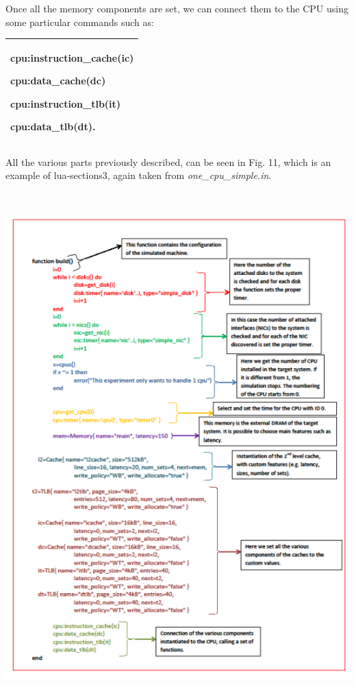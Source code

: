 \documentclass[a4paper]{article}
\begin{document}
\bigskip

{
Once all the memory components are set, we can connect them to the CPU
using some particular commands such as:}

\begin{flushleft}
\tablehead{}
\begin{supertabular}{|m{6.29346in}|}
\hline
{\ttfamily cpu:instruction\_cache(ic)}

{\ttfamily cpu:data\_cache(dc)}

{\ttfamily cpu:instruction\_tlb(it)}

\ttfamily cpu:data\_tlb(dt).\\\hline
\end{supertabular}
\end{flushleft}
{
All the various parts previously described, can be seen in Fig. 11,
which is an example of lua-sections3, again taken from
\textit{one\_cpu\_simple.in}.}

{\centering
\includegraphics[width=5.7807in,height=7.7654in]{img11.png}
 \par}
\end{document}
